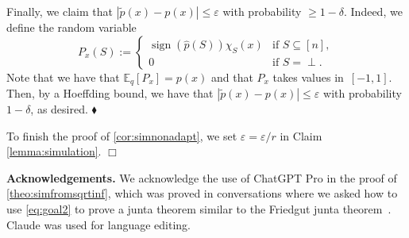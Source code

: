 \documentclass[11pt]{article}
\newcommand{\1}{\mathbf{1}}
\newcommand{\eps}{\varepsilon}
\DeclareMathOperator{\sign}{sign}
\theoremstyle{plain}
\theoremstyle{definition}
\theoremstyle{remark}
\renewenvironment{proof}[1][]{
    	\begin{trivlist}
     	\item[\hspace{\labelsep}{\em\noindent Proof#1:\/}]}
     	{{\hfill$\Box$}
    	\end{trivlist}
  }
\newenvironment{claimproof}[1][]{
  		\begin{trivlist}
   		\item[\hspace{\labelsep}{\sc\noindent Proof #1:\/}]}
   		{{\hfill$\blacklozenge$}
  		\end{trivlist}
  }
\begin{document}
\begin{proof}
\begin{claimproof}
    Finally, we claim that $|\widetilde p(x)-p(x)|\leq \eps$ with probability $\geq 1-\delta$. Indeed, we define the random variable 
    \begin{equation*}
        P_{x}(S):=\left\{\begin{array}{ll}
        \sign(\widehat p(S))\chi_{S}(x) & \text{if }S\subseteq [n], \\
        0 & \text{if }S=\perp.
    \end{array}\right.
    \end{equation*}
    Note that we have that $\mathbb E_{q}[P_{x}]=p(x)$ and that $P_{x}$ takes values in~$[-1,1]$. 
    Then, by a Hoeffding bound, we have that $|\widetilde p(x)-p(x)|\leq \eps$ with probability $1-\delta$, as desired. 
    \end{claimproof}
    To finish the proof of \cref{cor:simnonadapt}, we set $\varepsilon=\varepsilon/r$ in Claim \ref{lemma:simulation}.
\end{proof}

\textbf{Acknowledgements.} We acknowledge the use of ChatGPT Pro in the proof of \cref{theo:simfromsqrtinf}, which was proved in conversations where we asked how to use \cref{eq:goal2} to prove a junta theorem similar to the Friedgut junta theorem~\cite{friedgut1998boolean}. Claude was used for language editing. 


\end{document}
